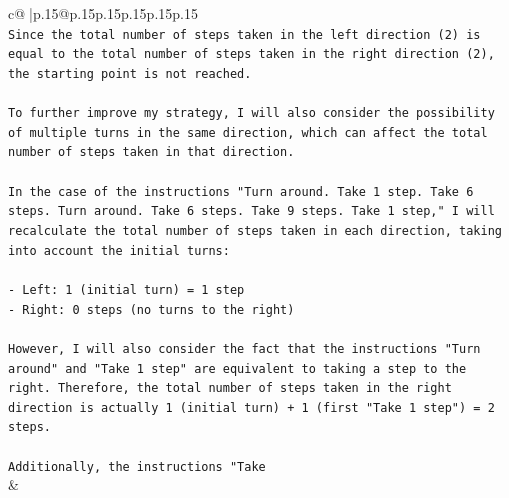 \documentclass{article}
\begin{document}
{\begin{supertabular}{c@{$\;$}|p{.15\linewidth}@{}p{.15\linewidth}p{.15\linewidth}p{.15\linewidth}p{.15\linewidth}p{.15\linewidth}}
{{{\\ 
\texttt{Since the total number of steps taken in the left direction (2) is equal to the total number of steps taken in the right direction (2), the starting point is not reached.} \\
\\ 
\texttt{To further improve my strategy, I will also consider the possibility of multiple turns in the same direction, which can affect the total number of steps taken in that direction.} \\
\\ 
\texttt{In the case of the instructions "Turn around. Take 1 step. Take 6 steps. Turn around. Take 6 steps. Take 9 steps. Take 1 step," I will recalculate the total number of steps taken in each direction, taking into account the initial turns:} \\
\\ 
\texttt{{-} Left: 1 (initial turn) = 1 step} \\
\texttt{{-} Right: 0 steps (no turns to the right)} \\
\\ 
\texttt{However, I will also consider the fact that the instructions "Turn around" and "Take 1 step" are equivalent to taking a step to the right. Therefore, the total number of steps taken in the right direction is actually 1 (initial turn) + 1 (first "Take 1 step") = 2 steps.} \\
\\ 
\texttt{Additionally, the instructions "Take} \\
            }
        }
    }
    & \\ \\

\end{supertabular}
}
\end{document}

